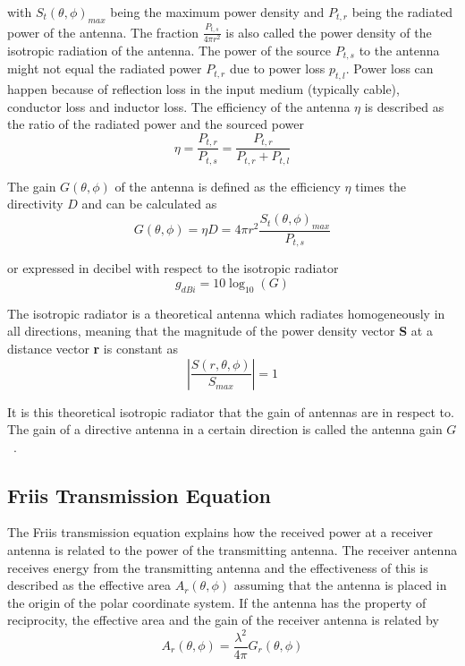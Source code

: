 with $S_ t\left(\theta, \phi\right)_{max}$ being the maximum power density and $P_{t,r}$ being the radiated power of the antenna. The fraction $\frac{P_{t,s}}{4 \pi r^2}$ is also called the power density of the isotropic radiation of the antenna. The power of the source $P_{t,s}$ to the antenna might not equal the radiated power $P_{t,r}$ due to power loss $p_{t,l}$. Power loss can happen because of reflection loss in the input medium (typically cable), conductor loss and inductor loss. The efficiency of the antenna $\eta$ is described as the ratio of the radiated power and the sourced power
\begin{equation} \label{eq:antenna_efficiency}
    \eta = \frac{P_{t,r}}{P_{t,s}} = \frac{P_{t,r}}{P_{t,r}+P_{t,l}}
\end{equation}

The gain $G \left( \theta, \phi \right)$ of the antenna is defined as the efficiency $\eta$ times the directivity $D$ and can be calculated as
\begin{equation} \label{eq:gain}
    G \left( \theta, \phi \right) = \eta  D = 4 \pi r^2 \frac{S_t \left(\theta, \phi\right)_{max}}{P_{t,s}}
\end{equation}

or expressed in decibel with respect to the isotropic radiator
\begin{equation} \label{eq:gain_dbi}
    g_{dBi} = 10 \log_{10}\left(G\right)
\end{equation}

The isotropic radiator is a theoretical antenna which radiates homogeneously in all directions, meaning that the magnitude of the power density vector \textbf{S} at a distance vector \textbf{r} is constant as
\begin{equation} \label{eq:isotropic_radiation}
    \left| \frac{S \left(r, \theta, \phi \right)}{S_{max}} \right|=1
\end{equation}

It is this theoretical isotropic radiator that the gain of antennas are in respect to. The gain of a directive antenna in a certain direction is called the antenna gain $G$~\cite[pp. 10-12]{ant_beam_form}.

\subsection{Friis Transmission Equation}
The Friis transmission equation explains how the received power at a receiver antenna is related to the power of the transmitting antenna. The receiver antenna receives energy from the transmitting antenna and the effectiveness of this is described as the effective area $A_r\left( \theta, \phi \right)$ assuming that the antenna is placed in the origin of the polar coordinate system. If the antenna has the property of reciprocity, the effective area and the gain of the receiver antenna is related by 
\begin{equation} \label{eq:effectivate_area}
    A_r \left( \theta, \phi \right) = \frac{\lambda^2}{4 \pi} G_r \left( \theta, \phi \right)
\end{equation}


